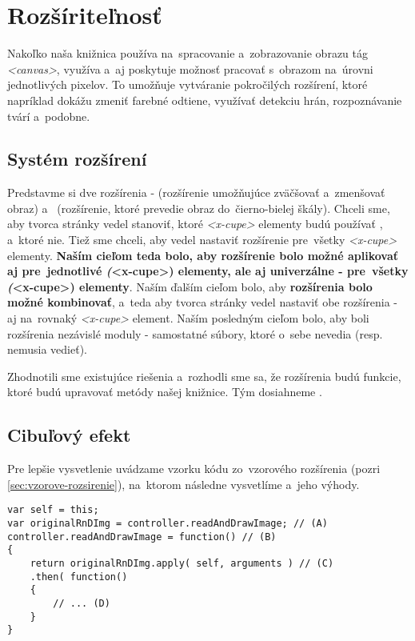 \section{Rozšíriteľnosť}

Nakoľko naša knižnica používa na~spracovanie a~zobrazovanie obrazu tág \emph{<canvas>}, využíva a~aj poskytuje možnosť pracovať s~obrazom na~úrovni jednotlivých pixelov. To umožňuje vytváranie pokročilých rozšírení, ktoré napríklad dokážu zmeniť farebné odtiene, využívať detekciu hrán, rozpoznávanie tvárí a~podobne.

\subsection{Systém rozšírení}
\label{sec:system-rozsireni}

Predstavme si dve rozšírenia -  (rozšírenie umožňujúce zväčšovať a~zmenšovať obraz) a~ (rozšírenie, ktoré prevedie obraz do~čierno-bielej škály). Chceli sme, aby tvorca stránky vedel stanoviť, ktoré \emph{<x-cupe>} elementy budú používať , a~ktoré nie. Tiež sme chceli, aby vedel nastaviť rozšírenie  pre~všetky \emph{<x-cupe>} elementy. \textbf{Naším cieľom teda bolo, aby rozšírenie bolo možné aplikovať aj pre~jednotlivé \emph(<x-cupe>) elementy, ale aj univerzálne - pre~všetky \emph(<x-cupe>) elementy}. Naším ďalším cieľom bolo, aby \textbf{rozšírenia bolo možné kombinovať}, a~teda aby tvorca stránky vedel nastaviť obe rozšírenia -  aj  na~rovnaký \emph{<x-cupe>} element. Naším posledným cieľom bolo, aby boli rozšírenia nezávislé moduly - samostatné súbory, ktoré o~sebe nevedia (resp. nemusia vedieť).

Zhodnotili sme existujúce riešenia a~rozhodli sme sa, že rozšírenia budú funkcie, ktoré budú upravovať metódy našej knižnice. Tým dosiahneme .

\subsection{Cibuľový efekt}

Pre lepšie vysvetlenie uvádzame vzorku kódu zo~vzorového rozšírenia  (pozri \ref{sec:vzorove-rozsirenie}), na~ktorom následne vysvetlíme  a~jeho výhody.

\begin{lstlisting}[label=vytvaranie-cibuloveho-efektu,caption=Vytváranie cibuľového efektu.]
var self = this;
var originalRnDImg = controller.readAndDrawImage; // (A)
controller.readAndDrawImage = function() // (B)
{
    return originalRnDImg.apply( self, arguments ) // (C)
    .then( function()
    {
        // ... (D)
    }
}
\end{lstlisting}

